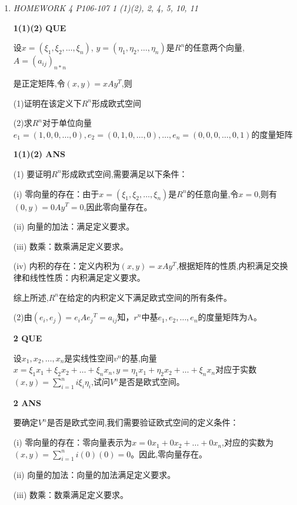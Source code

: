 \documentclass[11pt,letterpaper]{ctexart}
\begin{document}
\begin{enumerate}
\item \textit{HOMEWORK 4 {P106-107} 1 (1)(2), 2, 4, 5, 10, 11}%

\textbf{1(1)(2) QUE}
\bigskip

	设${x = (\xi_1, \xi_2, \dots, \xi_n)}$, $y = (\eta_1, \eta_2, \dots, \eta_n)$是${R^n}$的任意两个向量, $A = (a_{ij})_{n*n}$
	
	是正定矩阵,令$(x, y) = xAy^T$,则

	(1)证明在该定义下$R^n$形成欧式空间

	(2)求$R^n$对于单位向量$e_1 = (1, 0, 0, \dots, 0), e_2 = (0, 1, 0, \dots, 0), \dots, e_n = (0, 0,0, \dots, 0, 1)$的度量矩阵

\textbf{1(1)(2) ANS}
\bigskip

(1) 要证明$R^n$形成欧式空间,需要满足以下条件：

(i) 零向量的存在：由于$x = (\xi_1, \xi_2, \dots, \xi_n)$是$R^n$的任意向量,令$x = 0$,则有$(0, y) = 0Ay^T = 0$,因此零向量存在。

(ii) 向量的加法：满足定义要求。

(iii) 数乘：数乘满足定义要求。

(iv) 内积的存在：定义内积为$(x, y) = xAy^T$,根据矩阵的性质,内积满足交换律和线性性质：内积满足定义要求。

综上所述,$R^n$在给定的内积定义下满足欧式空间的所有条件。



(2)由$(e_i,e_j) = e_iA{e_j}^T = a_{ij}$知，$r^n$中基$e_1,e_2, \dots, e_n$的度量矩阵为A。


\textbf{2 QUE}
\bigskip

	设$x_1, x_2, \dots, x_n$是实线性空间$v^n$的基,向量$x = \xi_1x_1 +\xi_2x_2+\dots+\xi_nx_n, y = \eta_1x_1+ \eta_2x_2+\dots
	+\xi_nx_n$对应于实数$(x, y) = \sum_{i = 1}^ni\xi_i\eta_i$,试问$V^n$是否是欧式空间。


\textbf{2 ANS}
\bigskip

要确定$V^n$是否是欧式空间,我们需要验证欧式空间的定义条件：

(i) 零向量的存在：零向量表示为$x = 0x_1 + 0x_2 + \dots + 0x_n$,对应的实数为$(x, y) = \sum_{i=1}^ni(0)(0) = 0$。因此,零向量存在。

(ii) 向量的加法：向量的加法满足定义要求。

(iii) 数乘：数乘满足定义要求。


\end{enumerate}
\end{document}
